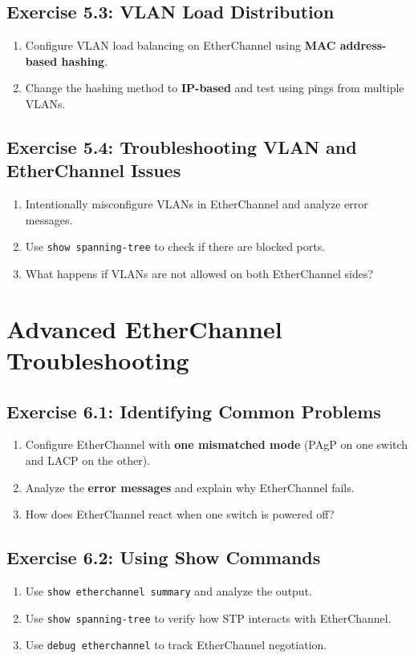 \documentclass[a4paper]{article}
\begin{document}
\subsection{Exercise 5.3: VLAN Load Distribution}
\begin{enumerate}
    \item Configure VLAN load balancing on EtherChannel using \textbf{MAC address-based hashing}.
    \item Change the hashing method to \textbf{IP-based} and test using pings from multiple VLANs.
\end{enumerate}

\subsection{Exercise 5.4: Troubleshooting VLAN and EtherChannel Issues}
\begin{enumerate}
    \item Intentionally misconfigure VLANs in EtherChannel and analyze error messages.
    \item Use \texttt{show spanning-tree} to check if there are blocked ports.
    \item What happens if VLANs are not allowed on both EtherChannel sides?
\end{enumerate}

\section{Advanced EtherChannel Troubleshooting}
\subsection{Exercise 6.1: Identifying Common Problems}
\begin{enumerate}
    \item Configure EtherChannel with \textbf{one mismatched mode} (PAgP on one switch and LACP on the other).
    \item Analyze the \textbf{error messages} and explain why EtherChannel fails.
    \item How does EtherChannel react when one switch is powered off?
\end{enumerate}

\subsection{Exercise 6.2: Using Show Commands}
\begin{enumerate}
    \item Use \texttt{show etherchannel summary} and analyze the output.
    \item Use \texttt{show spanning-tree} to verify how STP interacts with EtherChannel.
    \item Use \texttt{debug etherchannel} to track EtherChannel negotiation.
\end{enumerate}
\end{document}
